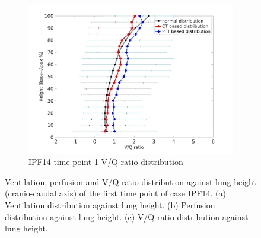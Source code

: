 \begin{figure}[htbp]
\begin{subfigure}{.6\linewidth}
  \includegraphics[width=\linewidth,trim={{.0\wd0} {.0\wd0} {.0\wd0} {.0\wd0}},clip]{Appendix/Image_AppexB/IPF1401/IPF1401_VQAgainstLungHeight.jpg}
  \caption{IPF14 time point 1 V/Q ratio distribution}
  \label{fig:IPF1401VQDistribution-c}
\end{subfigure}
\caption{ Ventilation, perfusion and V/Q ratio distribution against lung height (cranio-caudal axis) of the first time point of case IPF14. (a) Ventilation distribution against lung height. (b) Perfusion distribution against lung height. (c) V/Q ratio distribution against lung height.}
\label{fig:IPF1401VQDistribution}
\end{figure}

